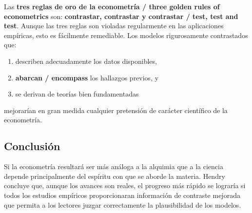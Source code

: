 \documentclass[12pt]{article}
\begin{document}
Las \textbf{tres reglas de oro de la econometr\'ia / three golden rules of econometrics} son: \textbf{contrastar, contrastar y contrastar / test, test and test}. Aunque las tres reglas son violadas regularmente en las aplicaciones emp\'iricas, esto es f\'acilmente remediable. Los modelos rigurosamente contrastados que:
\begin{enumerate}
  \item describen adecuadamente los datos disponibles,
  \item \textbf{abarcan / encompass} los hallazgos previos, y
  \item se derivan de teor\'ias bien fundamentadas
\end{enumerate}
mejorar\'ian en gran medida cualquier pretensi\'on de car\'acter cient\'ifico de la econometr\'ia.

\subsection{Conclusi\'on}

Si la econometr\'ia resultar\'a ser m\'as an\'aloga a la alquimia que a la ciencia depende principalmente del esp\'iritu con que se aborde la materia. Hendry concluye que, aunque los avances son reales, el progreso m\'as r\'apido se lograr\'ia si todos los estudios emp\'iricos proporcionaran informaci\'on de contraste mejorada que permita a los lectores juzgar correctamente la plausibilidad de los modelos.
\end{document}
